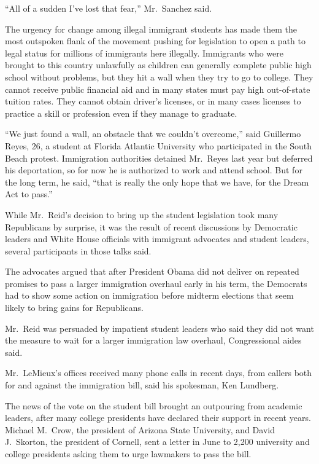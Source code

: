 ﻿\documentclass[12pt]{article}
\begin{document}
``All of a sudden I've lost that fear,'' Mr.~Sanchez said.

The urgency for change among illegal immigrant students has made them the most outspoken flank of
the movement pushing for legislation to open a path to legal status for millions of immigrants here
illegally. Immigrants who were brought to this country unlawfully as children can generally complete
public high school without problems, but they hit a wall when they try to go to college. They cannot
receive public financial aid and in many states must pay high out-of-state tuition rates. They
cannot obtain driver's licenses, or in many cases licenses to practice a skill or profession even if
they manage to graduate.

``We just found a wall, an obstacle that we couldn't overcome,'' said Guillermo Reyes, 26, a student
at Florida Atlantic University who participated in the South Beach protest. Immigration authorities
detained Mr.~Reyes last year but deferred his deportation, so for now he is authorized to work and
attend school. But for the long term, he said, ``that is really the only hope that we have, for the
Dream Act to pass.''

While Mr.~Reid's decision to bring up the student legislation took many Republicans by surprise, it
was the result of recent discussions by Democratic leaders and White House officials with immigrant
advocates and student leaders, several participants in those talks said.

The advocates argued that after President Obama did not deliver on repeated promises to pass a
larger immigration overhaul early in his term, the Democrats had to show some action on immigration
before midterm elections that seem likely to bring gains for Republicans.

Mr.~Reid was persuaded by impatient student leaders who said they did not want the measure to wait
for a larger immigration law overhaul, Congressional aides said.

Mr.~LeMieux's offices received many phone calls in recent days, from callers both for and against
the immigration bill, said his spokesman, Ken Lundberg.

The news of the vote on the student bill brought an outpouring from academic leaders, after many
college presidents have declared their support in recent years. Michael M.~Crow, the president of
Arizona State University, and David J.~Skorton, the president of Cornell, sent a letter in June to
2,200 university and college presidents asking them to urge lawmakers to pass the bill.
\end{document}
